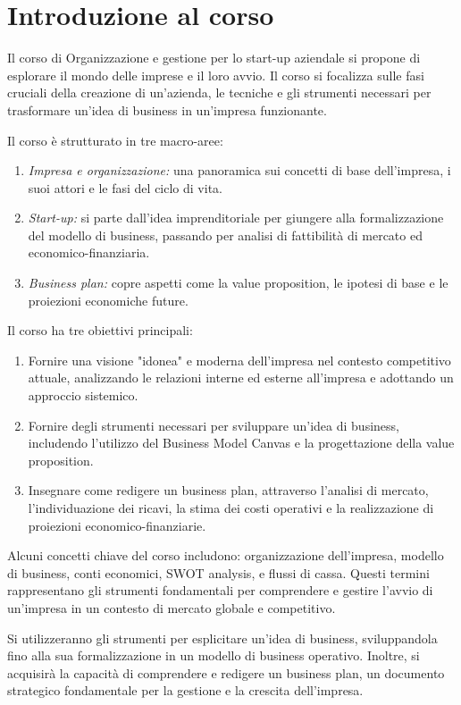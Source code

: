 \chapter*{Introduzione al corso}
Il corso di Organizzazione e gestione per lo start-up aziendale si propone di esplorare il mondo delle imprese e il loro avvio. Il corso si focalizza sulle fasi cruciali della creazione di un'azienda, le tecniche e gli strumenti necessari per trasformare un'idea di business in un'impresa funzionante.

Il corso è strutturato in tre macro-aree:
\begin{enumerate}
    \item \textit{Impresa e organizzazione:} una panoramica sui concetti di base dell’impresa, i suoi attori e le fasi del ciclo di vita.
    \item \textit{Start-up:} si parte dall’idea imprenditoriale per giungere alla formalizzazione del modello di business, passando per analisi di fattibilità di mercato ed economico-finanziaria.
    \item \textit{Business plan:} copre aspetti come la value proposition, le ipotesi di base e le proiezioni economiche future.
\end{enumerate}
Il corso ha tre obiettivi principali:
\begin{enumerate}
    \item Fornire una visione "idonea" e moderna dell’impresa nel contesto competitivo attuale, analizzando le relazioni interne ed esterne all’impresa e adottando un approccio sistemico.
    \item Fornire degli strumenti necessari per sviluppare un’idea di business, includendo l’utilizzo del Business Model Canvas e la progettazione della value proposition.
    \item Insegnare come redigere un business plan, attraverso l’analisi di mercato, l’individuazione dei ricavi, la stima dei costi operativi e la realizzazione di proiezioni economico-finanziarie.
\end{enumerate}
Alcuni concetti chiave del corso includono: organizzazione dell’impresa, modello di business, conti economici, SWOT analysis, e flussi di cassa. Questi termini rappresentano gli strumenti fondamentali per comprendere e gestire l’avvio di un’impresa in un contesto di mercato globale e competitivo.

Si utilizzeranno gli strumenti per esplicitare un'idea di business, sviluppandola fino alla sua formalizzazione in un modello di business operativo. Inoltre, si acquisirà la capacità di comprendere e redigere un business plan, un documento strategico fondamentale per la gestione e la crescita dell'impresa.